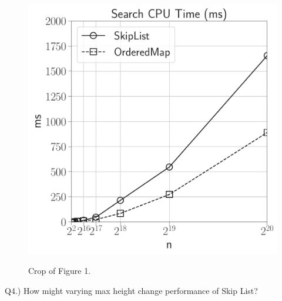 \documentclass[12pt]{article}
\begin{document}
\begin{figure}[H]
\begin{minipage}{0.32\textwidth}
		\label{fig:physical_memory}
	\end{minipage}\hfill\
	\begin{minipage}{0.32\textwidth}
		\centering
		\includegraphics[width=\linewidth]{../notebook/plot/sl_limsearch_cpu_time_(ms).pdf}
		\label{fig:physical_memory}
	\end{minipage}\hfill
	\caption{Crop of Figure 1.}
\end{figure}



Q4.) How might varying max height change performance of Skip List?\\
\end{document}
